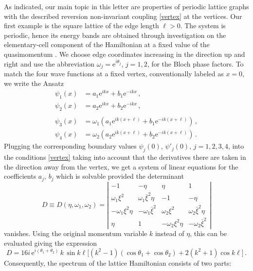 \documentclass[english]{elsarticle}
\newcommand{\e}{\mathrm{e}}
\begin{document}
As indicated, our main topic in this letter are properties of periodic lattice graphs with the described reversion non-invariant coupling \eqref{vertex} at the vertices. Our first example is the square lattice of the edge length $\ell>0$. The system is periodic, hence its energy bands are obtained through investigation on the elementary-cell component of the Hamiltonian at a fixed value of the quasimomentum \cite[Chap.~4]{BK13}. We choose edge coordinates increasing in the direction up and right and use the abbreviation $\omega_j = \e^{i\theta_j},\, j=1,2$, for the Bloch phase factors. To match the four wave functions at a fixed vertex, conventionally labeled as $x=0$, we write the Ansatz
\begin{align}
\psi_1(x) &= a_1\e^{ikx} + b_1\e^{-ikx}\,, \nonumber \\
\psi_2(x) &= a_2\e^{ikx} + b_2\e^{-ikx}\,, \nonumber  \\[-.7em] \label{Ansatz} \\[-.7em]
\psi_3(x) &= \omega_1 \left( a_1\e^{ik(x+\ell)} + b_1\e^{-ik(x+\ell)} \right)\,, \nonumber \\
\psi_4(x) &= \omega_2 \left( a_2\e^{ik(x+\ell)} + b_2\e^{-ik(x+\ell)} \right)\,. \nonumber
\end{align}
Plugging the corresponding boundary values $\psi_j(0),\,\psi'_j(0),\, j=1,2,3,4$, into the conditions \eqref{vertex} taking into account that the derivatives there are taken in the direction away from the vertex, we get a system of linear equations for the coefficients $a_j,\,b_j$ which is solvable provided the determinant
\begin{equation} \label{determinant}
D \equiv D(\eta,\omega_1,\omega_2) = \left|
\begin{array}{cccc}
-1 & -\eta & \eta & 1 \\[.2em]
\omega_1\xi^2 & \omega_1\bar\xi^2\eta & -1 & -\eta
\\[.2em]
-\omega_1\xi^2\eta & -\omega_1\bar\xi^2 & \omega_2\xi^2 & \omega_2\bar\xi^2\eta \\[.2em]
\eta & 1 & -\omega_2\xi^2\eta & -\omega_2\bar\xi^2
\end{array}
\right|
\end{equation}
vanishes. Using the original momentum variable $k$ instead of $\eta$, this can be evaluated giving the expression
\begin{equation} \label{determinant}
D = 16i\,\e^{i(\theta_1+\theta_2)}\, k\, \sin k\ell \big[ (k^2-1) (\cos\theta_1 + \cos\theta_2) + 2(k^2+1) \cos k\ell \big]\,.
\end{equation}
Consequently, the spectrum of the lattice Hamiltonian consists of two parts:
\end{document}
